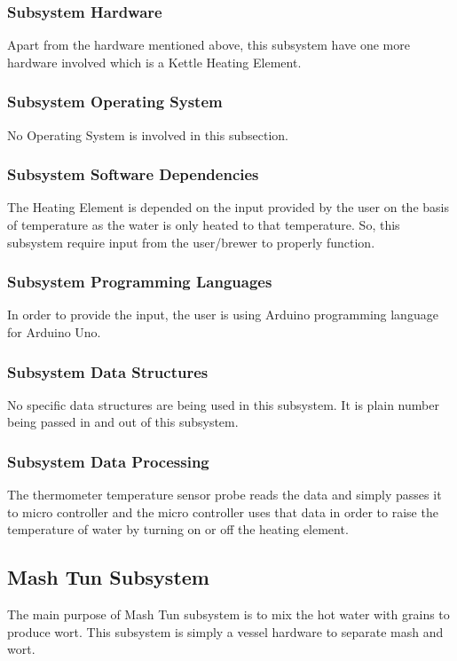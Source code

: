 \subsubsection{Subsystem Hardware}
Apart from the hardware mentioned above, this subsystem have one more hardware involved which is a Kettle Heating Element.

\subsubsection{Subsystem Operating System}
No Operating System is involved in this subsection.

\subsubsection{Subsystem Software Dependencies}
The Heating Element is depended on the input provided by the user on the basis of temperature as the water is only heated to that temperature. So, this subsystem require input from the user/brewer to properly function.

\subsubsection{Subsystem Programming Languages}
In order to provide the input, the user is using Arduino programming language for Arduino Uno.

\subsubsection{Subsystem Data Structures}
No specific data structures are being used in this subsystem. It is plain number being passed in and out of this subsystem.

\subsubsection{Subsystem Data Processing}
The thermometer temperature sensor probe reads the data and simply passes it to micro controller and the micro controller uses that data in order to raise the temperature of water by turning on or off the heating element. \newline

\subsection{Mash Tun Subsystem}
The main purpose of Mash Tun subsystem is to mix the hot water with grains to produce wort. This subsystem is simply a vessel hardware to separate mash and wort.

